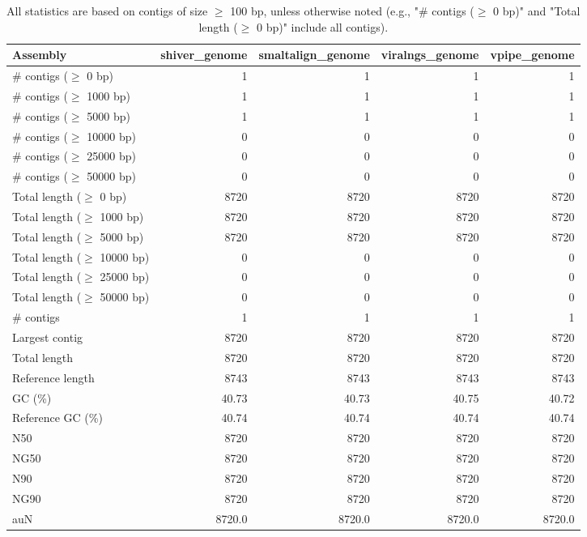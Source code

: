 \documentclass[12pt,a4paper]{article}
\begin{document}
\begin{table}[ht]
\begin{center}
\caption{All statistics are based on contigs of size $\geq$ 100 bp, unless otherwise noted (e.g., "\# contigs ($\geq$ 0 bp)" and "Total length ($\geq$ 0 bp)" include all contigs).}
\begin{tabular}{|l*{4}{|r}|}
\hline
Assembly & shiver\_genome & smaltalign\_genome & viralngs\_genome & vpipe\_genome \\ \hline
\# contigs ($\geq$ 0 bp) & 1 & 1 & 1 & 1 \\ \hline
\# contigs ($\geq$ 1000 bp) & 1 & 1 & 1 & 1 \\ \hline
\# contigs ($\geq$ 5000 bp) & 1 & 1 & 1 & 1 \\ \hline
\# contigs ($\geq$ 10000 bp) & 0 & 0 & 0 & 0 \\ \hline
\# contigs ($\geq$ 25000 bp) & 0 & 0 & 0 & 0 \\ \hline
\# contigs ($\geq$ 50000 bp) & 0 & 0 & 0 & 0 \\ \hline
Total length ($\geq$ 0 bp) & 8720 & 8720 & 8720 & 8720 \\ \hline
Total length ($\geq$ 1000 bp) & 8720 & 8720 & 8720 & 8720 \\ \hline
Total length ($\geq$ 5000 bp) & 8720 & 8720 & 8720 & 8720 \\ \hline
Total length ($\geq$ 10000 bp) & 0 & 0 & 0 & 0 \\ \hline
Total length ($\geq$ 25000 bp) & 0 & 0 & 0 & 0 \\ \hline
Total length ($\geq$ 50000 bp) & 0 & 0 & 0 & 0 \\ \hline
\# contigs & 1 & 1 & 1 & 1 \\ \hline
Largest contig & 8720 & 8720 & 8720 & 8720 \\ \hline
Total length & 8720 & 8720 & 8720 & 8720 \\ \hline
Reference length & 8743 & 8743 & 8743 & 8743 \\ \hline
GC (\%) & 40.73 & 40.73 & 40.75 & 40.72 \\ \hline
Reference GC (\%) & 40.74 & 40.74 & 40.74 & 40.74 \\ \hline
N50 & 8720 & 8720 & 8720 & 8720 \\ \hline
NG50 & 8720 & 8720 & 8720 & 8720 \\ \hline
N90 & 8720 & 8720 & 8720 & 8720 \\ \hline
NG90 & 8720 & 8720 & 8720 & 8720 \\ \hline
auN & 8720.0 & 8720.0 & 8720.0 & 8720.0 \\ \hline

\end{tabular}
\end{center}
\end{table}
\end{document}
